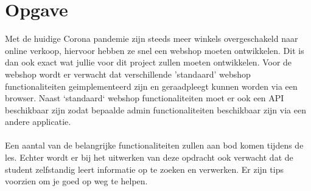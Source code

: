 \documentclass{article}
\begin{document}
\section{Opgave}
Met de huidige Corona pandemie zijn steeds meer winkels overgeschakeld naar online verkoop, hiervoor hebben ze snel een webshop moeten ontwikkelen. Dit is dan ook exact wat jullie voor dit project zullen moeten ontwikkelen. Voor de webshop wordt er verwacht dat verschillende 'standaard' webshop functionaliteiten geimplementeerd zijn en geraadpleegt kunnen worden via een browser. Naast `standaard` webshop functionaliteiten moet er ook een API beschikbaar zijn zodat bepaalde admin functionaliteiten beschikbaar zijn via een andere applicatie.
\\
\\
Een aantal van de belangrijke functionaliteiten zullen aan bod komen tijdens de les. Echter wordt er bij het uitwerken van deze opdracht ook verwacht dat de student zelfstandig leert informatie op te zoeken en verwerken. Er zijn tips voorzien om je goed op weg te helpen.
\end{document}
